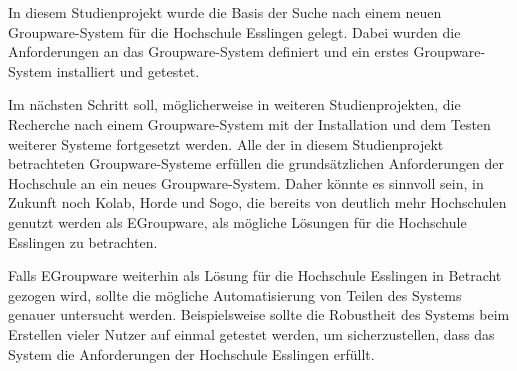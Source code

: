 In diesem Studienprojekt wurde die Basis der Suche nach einem neuen Groupware-System für die Hochschule Esslingen gelegt.
Dabei wurden die Anforderungen an das Groupware-System definiert und ein erstes Groupware-System installiert und getestet.

Im nächsten Schritt soll, möglicherweise in weiteren Studienprojekten, die Recherche nach einem Groupware-System mit der Installation und dem Testen weiterer Systeme fortgesetzt werden.
Alle der in diesem Studienprojekt betrachteten Groupware-Systeme erfüllen die grundsätzlichen Anforderungen der Hochschule an ein neues Groupware-System.
Daher könnte es sinnvoll sein, in Zukunft noch Kolab, Horde und Sogo, die bereits von deutlich mehr Hochschulen genutzt werden als EGroupware, als mögliche Lösungen für die Hochschule Esslingen zu betrachten.

Falls EGroupware weiterhin als Lösung für die Hochschule Esslingen in Betracht gezogen wird, sollte die mögliche Automatisierung von Teilen des Systems genauer untersucht werden.
Beispielsweise sollte die Robustheit des Systems beim Erstellen vieler Nutzer auf einmal getestet werden, um sicherzustellen, dass das System die Anforderungen der Hochschule Esslingen erfüllt.


